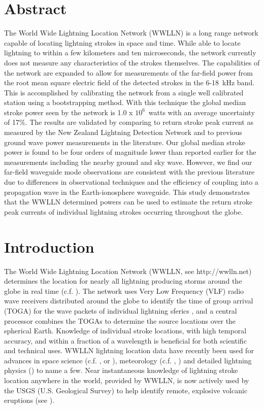 \section{Abstract}

The World Wide Lightning Location Network (WWLLN) is a long range network capable of locating lightning strokes in space and time.
While able to locate lightning to within a few kilometers and ten microseconds, the network currently does not measure any characteristics of the strokes themselves.
The capabilities of the network are expanded to allow for measurements of the far-field power from the root mean square electric field of the detected strokes in the 6-18~kHz band.
This is accomplished by calibrating the network from a single well calibrated station using a bootstrapping method.
With this technique the global median stroke power seen by the network is 1.0 x $10^6$~watts with an average uncertainty of 17\%.
The results are validated by comparing to return stroke peak current as measured by the New Zealand Lightning Detection Network and to previous ground wave power measurements in the literature.
Our global median stroke power is found to be four orders of magnitude lower than reported earlier for the measurements including the nearby ground and sky wave.
However, we find our far-field waveguide mode observations are consistent with the previous literature due to differences in observational techniques and the efficiency of coupling into a propagation wave in the Earth-ionosphere waveguide.
This study demonstrates that the WWLLN determined powers can be used to estimate the return stroke peak currents of individual lightning strokes occurring throughout the globe.

\section{Introduction}

The World Wide Lightning Location Network (WWLLN, see http://wwlln.net) determines the location for nearly all lightning producing storms around the globe in real time (c.f. \citet{Jacobson2006c}).
The network uses Very Low Frequency (VLF) radio wave receivers distributed around the globe to identify the time of group arrival (TOGA) for the wave packets of individual lightning sferics \citep{Dowden2002d}, and a central processor combines the TOGAs to determine the source locations over the spherical Earth.
Knowledge of individual stroke locations, with high temporal accuracy, and within a fraction of a wavelength is beneficial for both scientific and technical uses. WWLLN lightning location data have recently been used for advances in space science (c.f. \citet{Kumar2009}, or \citet{Holzworth2011}), meteorology (c.f. \citet{Price2009}, \citet{Thomas2010d}) and detailed lightning physics (\citet{Connaughton2010a}) to name a few.
Near instantaneous knowledge of lightning stroke location anywhere in the world, provided by WWLLN, is now actively used by the USGS (U.S. Geological Survey) to help identify remote, explosive volcanic eruptions (see \citet{Doughton2010}).

